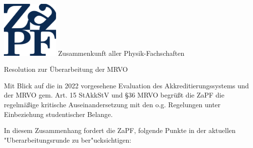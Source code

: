 \documentclass[DIV=calc]{scrartcl}
\newcommand{\zapf}{ZaPF\xspace}
\begin{document}
\hspace{0.87\textwidth}
\begin{minipage}{120pt}
	\vspace{-1.8cm}
	\includegraphics[width=80pt]{../logo.pdf}
	\centering
	\small Zusammenkunft aller Physik-Fachschaften
\end{minipage}

\begin{center}
  \huge{Resolution zur Überarbeitung der MRVO}\vspace{.25\baselineskip}\\
  \normalsize
\end{center}
\vspace{1cm}





Mit Blick auf die in 2022 vorgesehene Evaluation des Akkreditierungssystems und der MRVO gem. Art. 15 StAkkStV und §36 MRVO begrüßt die \zapf die regelmäßige kritische Auseinandersetzung mit den o.g. Regelungen unter Einbeziehung studentischer Belange.

In diesem Zusammenhang fordert die \zapf, folgende Punkte in der aktuellen "Uberarbeitungsrunde zu ber"ucksichtigen:
\end{document}
